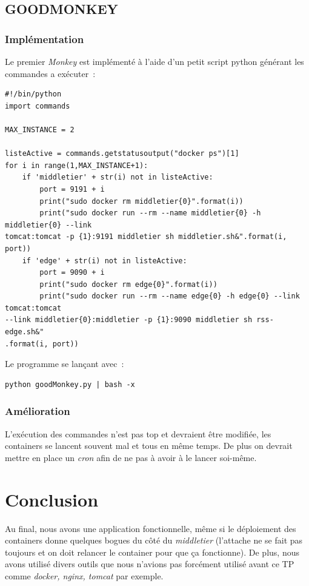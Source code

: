 \documentclass{article}
\begin{document}
	\subsection{GOODMONKEY}
	\subsubsection{Implémentation}
	Le premier \emph{Monkey} est implémenté à l'aide d'un petit script python générant les commandes a exécuter~:
	\begin{verbatim}
#!/bin/python
import commands

MAX_INSTANCE = 2

listeActive = commands.getstatusoutput("docker ps")[1]
for i in range(1,MAX_INSTANCE+1):
	if 'middletier' + str(i) not in listeActive:
		port = 9191 + i
		print("sudo docker rm middletier{0}".format(i))
		print("sudo docker run --rm --name middletier{0} -h middletier{0} --link
tomcat:tomcat -p {1}:9191 middletier sh middletier.sh&".format(i, port))
	if 'edge' + str(i) not in listeActive:
		port = 9090 + i
		print("sudo docker rm edge{0}".format(i))
		print("sudo docker run --rm --name edge{0} -h edge{0} --link tomcat:tomcat
--link middletier{0}:middletier -p {1}:9090 middletier sh rss-edge.sh&"
.format(i, port))
	\end{verbatim}
	Le programme se lançant avec~:
	\begin{verbatim}
python goodMonkey.py | bash -x
	\end{verbatim}
	\subsubsection{Amélioration}
	L'exécution des commandes n'est pas top et devraient être modifiée, les containers se lancent souvent mal et tous en même temps. De plus on devrait mettre en place un \emph{cron} afin de ne pas à avoir à le lancer soi-même.


		\section{Conclusion}
Au final, nous avons une application fonctionnelle, même si le déploiement des containers donne quelques bogues du côté du \emph{middletier} (l'attache ne se fait pas toujours et on doit relancer le container pour que ça fonctionne). De plus, nous avons utilisé divers outils que nous n'avions pas forcément utilisé avant ce TP comme \emph{docker, nginx, tomcat} par exemple.
\end{document}

